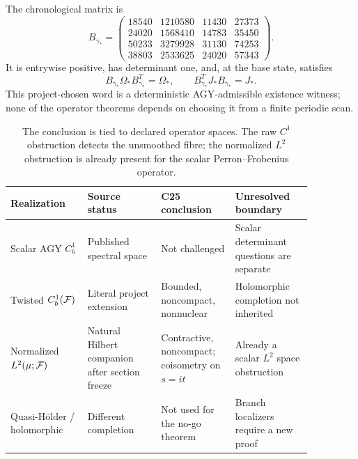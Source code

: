 The chronological matrix is
\begin{equation}
B_{\gamma_*}=
\begin{pmatrix}
18540&1210580&11430&27373\\
24020&1568410&14783&35450\\
50233&3279928&31130&74253\\
38803&2533625&24020&57343
\end{pmatrix}.
\label{eq:gamma-matrix}
\end{equation}
It is entrywise positive, has determinant one, and, at the base state,
satisfies
\[
B_{\gamma_*}\Omega_*B_{\gamma_*}^T=\Omega_*,
\qquad
B_{\gamma_*}^TJ_*B_{\gamma_*}=J_*.
\]
This project-chosen word is a deterministic AGY-admissible existence
witness; none of the operator theorems depends on choosing it from a finite
periodic scan.

\begin{table}[t]
\centering
\small
\begin{tabular}{>{\raggedright\arraybackslash}p{0.22\linewidth}
                >{\raggedright\arraybackslash}p{0.21\linewidth}
                >{\raggedright\arraybackslash}p{0.21\linewidth}
                >{\raggedright\arraybackslash}p{0.22\linewidth}}
\toprule
Realization & Source status & C25 conclusion & Unresolved boundary\\
\midrule
Scalar AGY \(C_b^1\) & Published spectral space & Not challenged & Scalar determinant questions are separate\\
Twisted \(C_b^1(\mathcal F)\) & Literal project extension & Bounded, noncompact, nonnuclear & Holomorphic completion not inherited\\
Normalized \(L^2(\mu;\mathcal F)\) & Natural Hilbert companion after section freeze & Contractive, noncompact; coisometry on \(s=it\) & Already a scalar \(L^2\) space obstruction\\
Quasi-H\"older / holomorphic & Different completion & Not used for the no-go theorem & Branch localizers require a new proof\\
\bottomrule
\end{tabular}
\caption{The conclusion is tied to declared operator spaces.  The raw
\(C^1\) obstruction detects the unsmoothed fibre; the normalized \(L^2\)
obstruction is already present for the scalar Perron--Frobenius operator.}
\label{tab:spaces}
\end{table}

